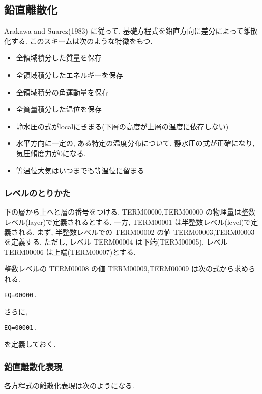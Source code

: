 ﻿
\subsection{鉛直離散化}

Arakawa and Suarez(1983) に従って, 
基礎方程式を鉛直方向に差分によって離散化する.
このスキームは次のような特徴をもつ.
%
\begin{itemize}
\item 全領域積分した質量を保存
\item 全領域積分したエネルギーを保存
\item 全領域積分の角運動量を保存
\item 全質量積分した温位を保存
\item 静水圧の式がlocalにきまる(下層の高度が上層の温度に依存しない)
\item 水平方向に一定の, ある特定の温度分布について,
      静水圧の式が正確になり, 気圧傾度力が0になる.
\item 等温位大気はいつまでも等温位に留まる
\end{itemize}      

\subsubsection{レベルのとりかた}

下の層から上へと層の番号をつける.
TERM00000,TERM00000 の物理量は整数レベル(layer)で定義されるとする.
一方, TERM00001 は半整数レベル(level)で定義される.
%
まず, 半整数レベルでの TERM00002 の値
TERM00003,TERM00003
を定義する.
%
ただし, レベル TERM00004 は下端(TERM00005),
レベル TERM00006 は上端(TERM00007)とする.

整数レベルの TERM00008 の値
TERM00009,TERM00009
は次の式から求められる.
%
\begin{verbatim}
EQ=00000.
\end{verbatim}
%
さらに,
\begin{verbatim}
EQ=00001.
\end{verbatim}
を定義しておく.

\subsubsection{鉛直離散化表現}

各方程式の離散化表現は次のようになる.

